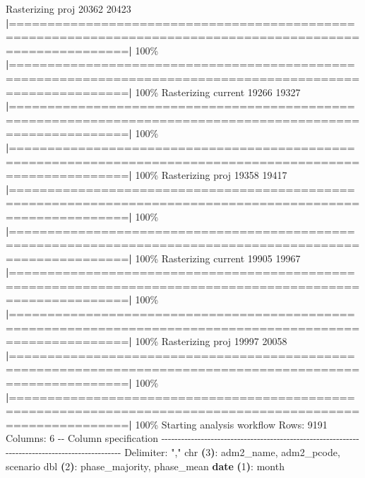 \documentclass[
  a4paper,
]{article}
\newenvironment{Shaded}{\begin{snugshade}}{\end{snugshade}}
\newcommand{\AttributeTok}[1]{\textcolor[rgb]{0.13,0.29,0.53}{#1}}
\newcommand{\BuiltInTok}[1]{#1}
\newcommand{\ErrorTok}[1]{\textcolor[rgb]{0.64,0.00,0.00}{\textbf{#1}}}
\newcommand{\ExtensionTok}[1]{#1}
\newcommand{\FunctionTok}[1]{\textcolor[rgb]{0.13,0.29,0.53}{\textbf{#1}}}
\newcommand{\KeywordTok}[1]{\textcolor[rgb]{0.13,0.29,0.53}{\textbf{#1}}}
\newcommand{\NormalTok}[1]{#1}
\newcommand{\StringTok}[1]{\textcolor[rgb]{0.31,0.60,0.02}{#1}}
\begin{document}
\begin{Shaded}
\begin{Highlighting}[]
\ExtensionTok{Rasterizing}\NormalTok{ proj 20362 20423 }
  \KeywordTok{|}\ExtensionTok{===========================================================================================================}\KeywordTok{|} \ExtensionTok{100\%}
  \KeywordTok{|}\ExtensionTok{===========================================================================================================}\KeywordTok{|} \ExtensionTok{100\%}
\ExtensionTok{Rasterizing}\NormalTok{ current 19266 19327 }
  \KeywordTok{|}\ExtensionTok{===========================================================================================================}\KeywordTok{|} \ExtensionTok{100\%}
  \KeywordTok{|}\ExtensionTok{===========================================================================================================}\KeywordTok{|} \ExtensionTok{100\%}
\ExtensionTok{Rasterizing}\NormalTok{ proj 19358 19417 }
  \KeywordTok{|}\ExtensionTok{===========================================================================================================}\KeywordTok{|} \ExtensionTok{100\%}
  \KeywordTok{|}\ExtensionTok{===========================================================================================================}\KeywordTok{|} \ExtensionTok{100\%}
\ExtensionTok{Rasterizing}\NormalTok{ current 19905 19967 }
  \KeywordTok{|}\ExtensionTok{===========================================================================================================}\KeywordTok{|} \ExtensionTok{100\%}
  \KeywordTok{|}\ExtensionTok{===========================================================================================================}\KeywordTok{|} \ExtensionTok{100\%}
\ExtensionTok{Rasterizing}\NormalTok{ proj 19997 20058 }
  \KeywordTok{|}\ExtensionTok{===========================================================================================================}\KeywordTok{|} \ExtensionTok{100\%}
  \KeywordTok{|}\ExtensionTok{===========================================================================================================}\KeywordTok{|} \ExtensionTok{100\%}
\ExtensionTok{Starting}\NormalTok{ analysis workflow}
\ExtensionTok{Rows:}\NormalTok{ 9191 Columns: 6                                                                                                }
\ExtensionTok{{-}{-}}\NormalTok{ Column specification }\AttributeTok{{-}{-}{-}{-}{-}{-}{-}{-}{-}{-}{-}{-}{-}{-}{-}{-}{-}{-}{-}{-}{-}{-}{-}{-}{-}{-}{-}{-}{-}{-}{-}{-}{-}{-}{-}{-}{-}{-}{-}{-}{-}{-}{-}{-}{-}{-}{-}{-}{-}{-}{-}{-}{-}{-}{-}{-}{-}{-}{-}{-}{-}{-}{-}{-}{-}{-}{-}{-}{-}{-}{-}{-}{-}{-}{-}{-}{-}{-}{-}{-}{-}{-}{-}{-}{-}{-}{-}{-}{-}{-}{-}{-}{-}{-}{-}}
\ExtensionTok{Delimiter:} \StringTok{","}
\ExtensionTok{chr}  \ErrorTok{(}\ExtensionTok{3}\KeywordTok{)}\BuiltInTok{:}\NormalTok{ adm2\_name, adm2\_pcode, scenario}
\ExtensionTok{dbl}  \ErrorTok{(}\ExtensionTok{2}\KeywordTok{)}\BuiltInTok{:}\NormalTok{ phase\_majority, phase\_mean}
\FunctionTok{date} \ErrorTok{(}\ExtensionTok{1}\KeywordTok{)}\BuiltInTok{:}\NormalTok{ month}


\end{Highlighting}
\end{Shaded}
\end{document}
